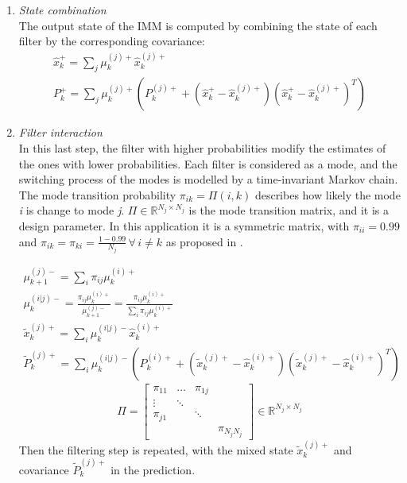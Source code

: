 \begin{enumerate}
\item \textit{State combination}\\
The output state of the IMM is computed by combining the state of each filter by the corresponding covariance:
\begin{gather}
  \hat{x}_k^+ = \sum_j \mu_k^{(j)+} \hat{x}_k^{(j)+}\\
  P_k^+ = \sum_j \mu_k^{(j)+} \left(P_k^{(j)+} + \left(\hat{x}_k^+ - \hat{x}_k^{(j)+}\right)\left(\hat{x}_k^+ - \hat{x}_k^{(j)+}\right)^T\right)
\end{gather}

\item \textit{Filter interaction}\\
In this last step, the filter with higher probabilities modify the estimates of the ones with lower probabilities. Each filter is considered as a mode, and the switching process of the modes is modelled by a time-invariant Markov chain. The mode transition probability $\pi_{ik} = \Pi(i, k)$ describes how likely the mode \textit{i} is change to mode \textit{j}. $\Pi \in \mathbb{R}^{N_j \times N_j}$ is the mode transition matrix, and it is a design parameter. In this application it is a symmetric matrix, with $\pi_{ii}=0.99$ and $\pi_{ik}=\pi_{ki}=\frac{1 - 0.99}{N_j} \,\forall \, i\neq k $ as proposed in \cite{kalman_based_IMM}.

\begin{gather}
  \mu_{k+1}^{(j)-} = \sum_i \pi_{ij}\mu_k^{(i)+}\\
  \mu_k^{(i|j)-} = \frac{\pi_{ij}\mu_k^{(i)+}}{\mu_{k+1}^{(j)-}} = \frac{\pi_{ij}\mu_k^{(i)+}}{\sum_i \pi_{ij}\mu_k^{(i)+}}\\
  \tilde{x}_k^{(j)+} = \sum_i \mu_k^{(i|j)-} \hat{x}_k^{(i)+}\\
  \tilde{P}_k^{(j)+} = \sum_i \mu_k^{(i|j)-} \left(P_k^{(i)+} + \left(\tilde{x}_k^{(j)+} - \hat{x}_k^{(i)+}\right)\left(\tilde{x}_k^{(j)+} - \hat{x}_k^{(i)+}\right)^T\right)
\end{gather}
\begin{equation}
  \Pi = 
  \begin{bmatrix}
    \pi_{11} & \dots & \pi_{1j} & \\
    \vdots & \ddots & \\
    \pi_{j1} &  & \ddots \\
     & & & \pi_{N_jN_j}
  \end{bmatrix}
  \in \mathbb{R}^{N_j \times N_j}
\end{equation}
Then the filtering step is repeated, with the mixed state $\tilde{x}_k^{(j)+}$ and covariance $\tilde{P}_k^{(j)+}$ in the prediction.
\end{enumerate}

